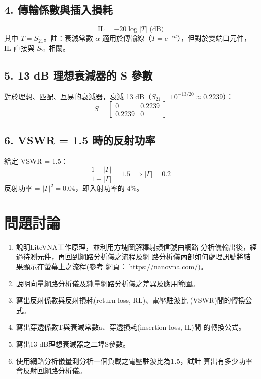 \documentclass[ paper=a4paper, 12pt]{article}
\begin{document}
\subsection{4. 傳輸係數與插入損耗}
\[
\text{IL} = -20 \log |T| \text{ (dB)}
\]
其中 \(T = S_{21}\)。註：衰減常數 \(\alpha\) 適用於傳輸線（\(T = e^{-\alpha l}\)），但對於雙端口元件，IL 直接與 \(S_{21}\) 相關。

\subsection{5. 13 dB 理想衰減器的 S 參數}
對於理想、匹配、互易的衰減器，衰減 13 dB（\(S_{21} = 10^{-13/20} \approx 0.2239\)）：
\[
S = \begin{bmatrix}
0 & 0.2239 \\
0.2239 & 0
\end{bmatrix}
\]

\subsection{6. VSWR = 1.5 時的反射功率}
給定 VSWR = 1.5：
\[
\frac{1 + |\Gamma|}{1 - |\Gamma|} = 1.5 \implies |\Gamma| = 0.2
\]
反射功率 = \(|\Gamma|^2 = 0.04\)，即入射功率的 4\%。

\newpage
\section{問題討論}

\begin{enumerate}
\item 說明LiteVNA工作原理，並利用方塊圖解釋射頻信號由網路
分析儀輸出後，經過待測元件，再回到網路分析儀之流程及網
路分析儀內部如何處理訊號將結果顯示在螢幕上之流程(參考
網頁： https://nanovna.com/)。
\item 說明向量網路分析儀及純量網路分析儀之差異及應用範圍。
\item 寫出反射係數與反射損耗(return loss, RL)、電壓駐波比
(VSWR)間的轉換公式。
\item 寫出穿透係數T與衰減常數a、穿透損耗(insertion loss, IL)間
的轉換公式。
\item 寫出13 dB理想衰減器之二埠S參數。
\item 使用網路分析儀量測分析一個負載之電壓駐波比為1.5，試計
算出有多少功率會反射回網路分析儀。
\end{enumerate}
\end{document}
